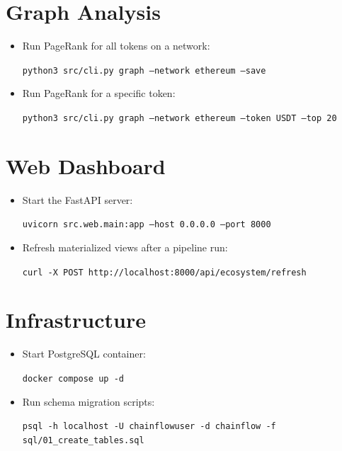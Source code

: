 \documentclass[a4paper,12pt]{report}
\begin{document}
\section*{Graph Analysis}
\begin{itemize}
\item Run PageRank for all tokens on a network:
\begin{flushleft}
    \texttt{python3 src/cli.py graph --network ethereum --save}
\end{flushleft}
\item Run PageRank for a specific token:
\begin{flushleft}
    \texttt{python3 src/cli.py graph --network ethereum --token USDT --top 20}
\end{flushleft}
\end{itemize}

\section*{Web Dashboard}
\begin{itemize}
\item Start the FastAPI server:
\begin{flushleft}
    \texttt{uvicorn src.web.main:app --host 0.0.0.0 --port 8000}
\end{flushleft}
\item Refresh materialized views after a pipeline run:
\begin{flushleft}
    \texttt{curl -X POST http://localhost:8000/api/ecosystem/refresh}
\end{flushleft}
\end{itemize}

\section*{Infrastructure}
\begin{itemize}
\item Start PostgreSQL container:
\begin{flushleft}
    \texttt{docker compose up -d}
\end{flushleft}
\item Run schema migration scripts:
\begin{flushleft}
    \texttt{psql -h localhost -U chainflowuser -d chainflow -f sql/01\_create\_tables.sql}
\end{flushleft}
\end{itemize}
\end{document}
